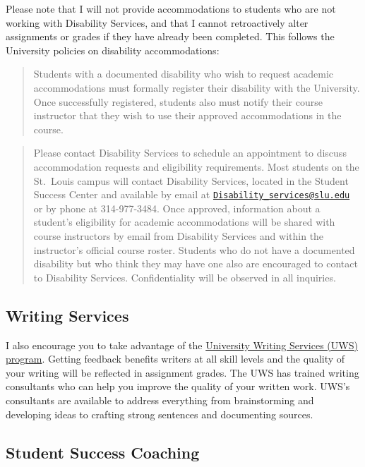\documentclass[
]{book}
\begin{document}
Please note that I will not provide accommodations to students who are not working with Disability Services, and that I cannot retroactively alter assignments or grades if they have already been completed. This follows the University policies on disability accommodations:

\begin{quote}
Students with a documented disability who wish to request academic accommodations must formally register their disability with the University. Once successfully registered, students also must notify their course instructor that they wish to use their approved accommodations in the course.
\end{quote}

\begin{quote}
Please contact Disability Services to schedule an appointment to discuss accommodation requests and eligibility requirements. Most students on the St.~Louis campus will contact Disability Services, located in the Student Success Center and available by email at \href{mailto:Disability_services@slu.edu}{\nolinkurl{Disability\_services@slu.edu}} or by phone at 314-977-3484. Once approved, information about a student's eligibility for academic accommodations will be shared with course instructors by email from Disability Services and within the instructor's official course roster. Students who do not have a documented disability but who think they may have one also are encouraged to contact to Disability Services. Confidentiality will be observed in all inquiries.
\end{quote}

\hypertarget{writing-services}{%
\subsection{Writing Services}\label{writing-services}}

I also encourage you to take advantage of the \href{https://www.slu.edu/life-at-slu/student-success-center/academic-support/university-writing-services/index.php}{University Writing Services (UWS) program}. Getting feedback benefits writers at all skill levels and the quality of your writing will be reflected in assignment grades. The UWS has trained writing consultants who can help you improve the quality of your written work. UWS's consultants are available to address everything from brainstorming and developing ideas to crafting strong sentences and documenting sources.

\hypertarget{student-success-coaching}{%
\subsection{Student Success Coaching}\label{student-success-coaching}}
\end{document}
